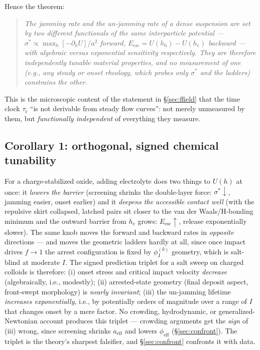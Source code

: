 \documentclass[11pt]{article}
\newcommand{\phiJ}{\phi_{\mathrm{J}}}
\newcommand{\sigmastar}{\sigma^{*}}
\begin{document}
\noindent Hence the theorem:
\begin{quote}
\emph{The jamming rate and the un-jamming rate of a dense suspension are set by two different functionals of the same interparticle potential --- $\sigmastar \propto \max_h[-\partial_h U]/a^2$ forward, $E_{\mathrm{esc}} = U(h_\mathrm{b})-U(h_\mathrm{c})$ backward --- with algebraic versus exponential sensitivity respectively. They are therefore independently tunable material properties, and no measurement of one (e.g., any steady or onset rheology, which probes only $\sigmastar$ and the ladders) constrains the other.}
\end{quote}
This is the microscopic content of the statement in \S\ref{sec:ffield} that the time clock $\tau_{\mathrm{r}}$ ``is not derivable from steady flow curves'': not merely unmeasured by them, but \emph{functionally independent} of everything they measure.

\subsection{Corollary 1: orthogonal, signed chemical tunability}
\label{sec:orthogonal}
For a charge-stabilized oxide, adding electrolyte does two things to $U(h)$ at once: it \emph{lowers the barrier} (screening shrinks the double-layer force: $\sigmastar\!\downarrow$, jamming easier, onset earlier) and it \emph{deepens the accessible contact well} (with the repulsive skirt collapsed, latched pairs sit closer to the van der Waals/H-bonding minimum and the outward barrier from $h_{\mathrm{c}}$ grows: $E_{\mathrm{esc}}\!\uparrow$, release exponentially slower). The same knob moves the forward and backward rates in \emph{opposite} directions --- and moves the geometric ladders hardly at all, since once impact drives $f \to 1$ the arrest configuration is fixed by $\phiJ^{(k)}$ geometry, which is salt-blind at moderate $I$. The signed prediction triplet for a salt sweep on charged colloids is therefore: (i) onset stress and critical impact velocity \emph{decrease} (algebraically, i.e., modestly); (ii) arrested-state geometry (final deposit aspect, front-swept morphology) is \emph{nearly invariant}; (iii) the un-jamming lifetime \emph{increases exponentially}, i.e., by potentially orders of magnitude over a range of $I$ that changes onset by a mere factor. No crowding, hydrodynamic, or generalized-Newtonian account produces this triplet --- crowding arguments get the \emph{sign} of (iii) wrong, since screening shrinks $a_{\mathrm{eff}}$ and lowers $\phi_{\mathrm{eff}}$ (\S\ref{sec:confront}). The triplet is the theory's sharpest falsifier, and \S\ref{sec:confront} confronts it with data.
\end{document}
